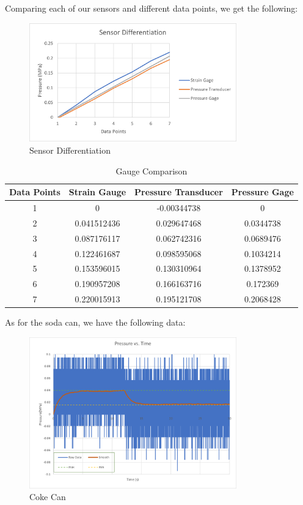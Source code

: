 \documentclass{article}
\begin{document}
Comparing each of our sensors and different data points, we get the following:

\begin{figure}[H]
  \centering
  \includegraphics[width=0.8\textwidth]{lab4images/SensorDifferentiation.png}
  \caption{Sensor Differentiation}
  \label{fig:sensor-differentiation}
\end{figure}


\begin{table}[H]
  \centering
  \caption{Gauge Comparison}
  \label{tab:gauge-comparison}
  \begin{tabular}{|c|c|c|c|}
  \hline
  Data Points & Strain Gauge & Pressure Transducer & Pressure Gage \\
  \hline
  1 & 0 & -0.00344738 & 0 \\
  2 & 0.041512436 & 0.029647468 & 0.0344738 \\
  3 & 0.087176117 & 0.062742316 & 0.0689476 \\
  4 & 0.122461687 & 0.098595068 & 0.1034214 \\
  5 & 0.153596015 & 0.130310964 & 0.1378952 \\
  6 & 0.190957208 & 0.166163716 & 0.172369 \\
  7 & 0.220015913 & 0.195121708 & 0.2068428 \\
  \hline
  \end{tabular}
\end{table}

As for the soda can, we have the following data:

\begin{figure}[H]
  \centering
  \includegraphics[width=0.8\textwidth]{lab4images/Cokecan.png}
  \caption{Coke Can}
  \label{fig:coke-can}
\end{figure}
\end{document}
